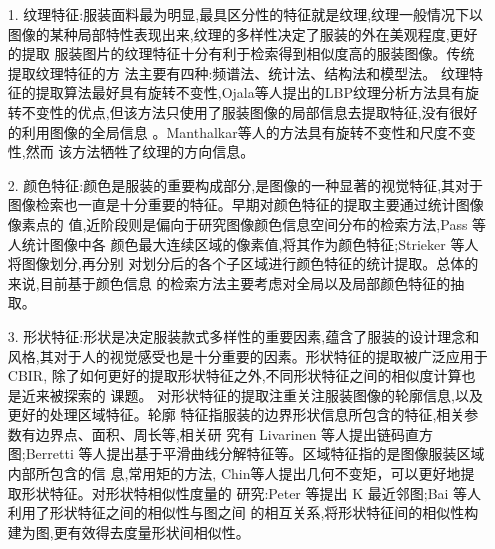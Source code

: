 \begin{itemize}
\item[1.]纹理特征:服装面料最为明显,最具区分性的特征就是纹理,纹理一般情况下以
图像的某种局部特性表现出来,纹理的多样性决定了服装的外在美观程度,更好的提取
服装图片的纹理特征十分有利于检索得到相似度高的服装图像。传统提取纹理特征的方
法主要有四种:频谱法、统计法、结构法和模型法。
纹理特征的提取算法最好具有旋转不变性,Ojala等人提出的LBP纹理分析方法具有旋转不变性的优点,但该方法只使用了服装图像的局部信息去提取特征,没有很好
的利用图像的全局信息\cite{ojala2002multiresolution}
。Manthalkar等人的方法具有旋转不变性和尺度不变性,然而
该方法牺牲了纹理的方向信息\cite{manthalkar2003rotation}。

\item[2.] 颜色特征:颜色是服装的重要构成部分,是图像的一种显著的视觉特征,其对于
图像检索也一直是十分重要的特征。早期对颜色特征的提取主要通过统计图像像素点的
值,近阶段则是偏向于研究图像颜色信息空间分布的检索方法,Pass 等人统计图像中各
颜色最大连续区域的像素值,将其作为颜色特征\cite{pass1996comparing};Strieker 等人将图像划分,再分别
对划分后的各个子区域进行颜色特征的统计提取\cite{stricker1997spectral}。总体的来说,目前基于颜色信息
的检索方法主要考虑对全局以及局部颜色特征的抽取。

\item[3.] 形状特征:形状是决定服装款式多样性的重要因素,蕴含了服装的设计理念和
风格,其对于人的视觉感受也是十分重要的因素。形状特征的提取被广泛应用于 CBIR,
除了如何更好的提取形状特征之外,不同形状特征之间的相似度计算也是近来被探索的
课题。
对形状特征的提取注重关注服装图像的轮廓信息,以及更好的处理区域特征。轮廓
特征指服装的边界形状信息所包含的特征,相关参数有边界点、面积、周长等,相关研
究有 Livarinen 等人提出链码直方图\cite{iivarinen1997comparison};Berretti
等人提出基于平滑曲线分解特征等\cite{berretti2000retrieval}。区域特征指的是图像服装区域内部所包含的信
息,常用矩的方法, Chin等人提出几何不变矩，可以更好地提取形状特征\cite{teh1988image}。对形状特相似性度量的
研究:Peter 等提出 K 最近邻图\cite{kontschieder2009beyond};Bai 等人利用了形状特征之间的相似性与图之间
的相互关系,将形状特征间的相似性构建为图,更有效得去度量形状间相似性\cite{bai2010learning}。
\end{itemize}

